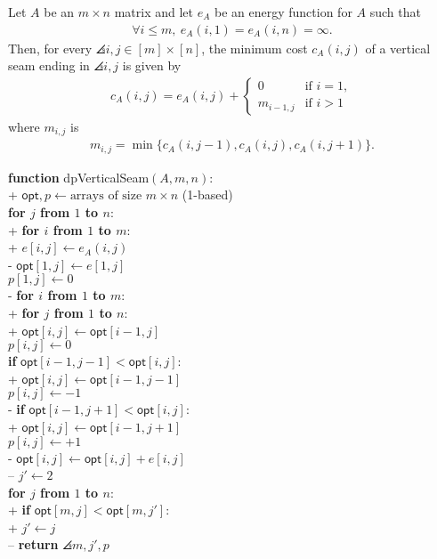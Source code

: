 \documentclass{article}
\begin{document}
\begin{theorem}
	Let $A$ be an $m\times n$ matrix and let $e_A$ be an energy function for
	$A$ such that
	\begin{align*}
		\forall i \leq m,\: e_A(i,1) = e_A(i,n) = \infty.
	\end{align*}
	Then, for every $\angles{i,j}\in[m]\times[n]$, the minimum cost $c_A(i,j)$
	of a vertical seam ending in $\angles{i,j}$ is given by
	\begin{align*}
		c_A(i,j) = e_A(i,j) + \begin{cases}
			                      0         & \text{if }i=1, \\
			                      m_{i-1,j} & \text{if }i>1
		                      \end{cases}
	\end{align*}
	where $m_{i,j}$ is
	\begin{align*}
		m_{i,j} = \min\{c_A(i,j-1), c_A(i,j), c_A(i,j+1)\}.
	\end{align*}
\end{theorem}

\begin{pseudo}
	\textbf{function} \textsf{dpVerticalSeam}$(A, m, n)$:						\\+
	$\textsf{opt},p\leftarrow\text{arrays of size $m\times n$}$ (1-based)	\\
	\textbf{for $j$ from $1$ to $n$}:										\\+
	\textbf{for $i$ from $1$ to $m$}:									\\+
	$e[i,j]\leftarrow e_A(i,j)$										\\-
	$\textsf{opt}[1,j]\leftarrow e[1,j]$								\\
	$p[1,j]\leftarrow 0$												\\-
	\textbf{for $i$ from $1$ to $m$}:										\\+
	\textbf{for $j$ from $1$ to $n$}:									\\+
	$\textsf{opt}[i,j]\leftarrow\textsf{opt}[i-1,j]$				\\
	$p[i,j]\leftarrow 0$											\\
	\textbf{if} $\textsf{opt}[i-1,j-1]<\textsf{opt}[i,j]$:			\\+
	$\textsf{opt}[i,j]\leftarrow\textsf{opt}[i-1,j-1]$			\\
	$p[i,j]\leftarrow -1$										\\-
	\textbf{if} $\textsf{opt}[i-1,j+1]<\textsf{opt}[i,j]$:			\\+
	$\textsf{opt}[i,j]\leftarrow\textsf{opt}[i-1,j+1]$			\\
	$p[i,j]\leftarrow +1$										\\-
	$\textsf{opt}[i,j]\leftarrow\textsf{opt}[i,j]+e[i,j]$			\\--
	$j'\leftarrow 2$														\\
	\textbf{for $j$ from $1$ to $n$}:										\\+
	\textbf{if} $\textsf{opt}[m,j]<\textsf{opt}[m,j']$:					\\+
	$j'\leftarrow j$												\\--
	\textbf{return} $\angles{m,j'}, p$

\end{pseudo}
\end{document}
